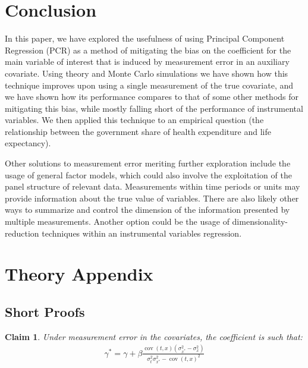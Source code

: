 \documentclass[10pt]{article}
\newtheorem{claim}{Claim}
\begin{document}
    \section*{Conclusion}
        
        In this paper, we have explored the usefulness of using Principal Component Regression (PCR) as a method of mitigating the bias on the coefficient for the main variable of interest that is induced by measurement error in an auxiliary covariate. Using theory and Monte Carlo simulations we have shown how this technique improves upon using a single measurement of the true covariate, and we have shown how its performance compares to that of some other methods for mitigating this bias, while mostly falling short of the performance of instrumental variables. We then applied this technique to an empirical question (the relationship between the government share of health expenditure and life expectancy).

        Other solutions to measurement error meriting further exploration include the usage of general factor models, which could also involve the exploitation of the panel structure of relevant data. Measurements within time periods or units may provide information about the true value of variables. There are also likely other ways to summarize and control the dimension of the information presented by multiple measurements. Another option could be the usage of dimensionality-reduction techniques within an instrumental variables regression.

    \clearpage \newpage

    
    

    \clearpage \newpage

    \appendix

	\section*{Theory Appendix}
	\subsection*{Short Proofs}

        \setcounter{claim}{0}
        \setcounter{claimproof}{0}

            \begin{claim}
            Under measurement error in the covariates, the coefficient is such that:
            \begin{align}
                    \gamma^* = \gamma + \beta\frac{\operatorname{cov}(t,x)(\sigma^2_{x^*}-\sigma^2_x)}{\sigma_{t}^2\sigma_{x^*}^2-\operatorname{cov}({t,x})^2}
                \end{align}
            \end{claim}
            
\end{document}
